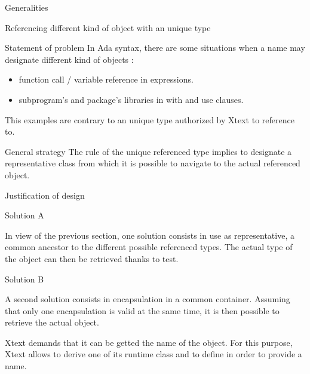 \documentclass[a4paper]{prjdoc}
\begin{document}
\begin{asection}{Generalities}
     \begin{asection}{Referencing different kind of object with an unique type}
        \label{sec:ReferencingUniqueType}        
        \begin{asection}{Statement of problem}            
        In Ada syntax, there are some situations when a name may designate different kind of objects :            
           \begin{itemize}
           \item function call / variable reference in expressions.
           \item subprogram's and package's libraries in with and use clauses.
           \end{itemize}
        This examples are contrary to an unique type authorized by Xtext to reference to.             
        \end{asection} %
         
        \begin{asection}{General strategy}
        The rule of the unique referenced type implies to designate a representative class from which 
        it is possible to navigate to the actual referenced object.           
        \end{asection} %
         
        \begin{asection}{Justification of design}
         
           \begin{asection}{Solution A}
           \label{sec:SolutionA}
            
           In view of the previous section, one solution consists in use as representative, 
           a common ancestor to the different possible referenced types. 
           The actual type of the object can then be retrieved thanks to  test.
            
           \end{asection} %
         
           \begin{asection}{Solution B}
           \label{sec:SolutionB}
            
           A second solution consists in encapsulation in a common container. 
           Assuming that only one encapsulation is valid at the same time,
           it is then possible to retrieve the actual object.
         
           Xtext demands that it can be getted the name of the object. 
           For this purpose, Xtext allows to derive one of its runtime class 
           and to define  in order to provide a name.
               

\end{asection}
\end{asection}
\end{asection}
\end{asection}
\end{document}

